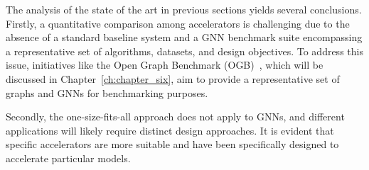 The analysis of the state of the art in previous sections yields several conclusions.
Firstly, a quantitative comparison among accelerators is challenging due to the absence of a standard baseline system and a GNN benchmark suite encompassing a representative set of algorithms, datasets, and design objectives.
To address this issue, initiatives like the Open Graph Benchmark (OGB)~\cite{NEURIPS2020_fb60d411}, which will be discussed in Chapter~\ref{ch:chapter_six}, aim to provide a representative set of graphs and GNNs for benchmarking purposes.

Secondly, the one-size-fits-all approach does not apply to GNNs, and different applications will likely require distinct design approaches.
It is evident that specific accelerators are more suitable and have been specifically designed to accelerate particular models.


